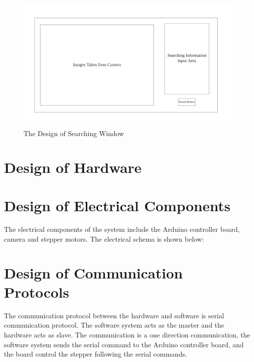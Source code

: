 \documentclass[12pt, titlepage]{article}
\begin{document}
\begin{figure}[H]
    \centering
    \includegraphics[scale=0.8]{Search.png}
    \caption{The Design of Searching Window}
\end{figure}

\section{Design of Hardware}


\section{Design of Electrical Components}

The electrical components of the system include the Arduino controller board, camera and stepper motors. The electrical schema is shown below:
\section{Design of Communication Protocols}


The communication protocol between the hardware and software is serial communication protocol. The software system acts as the master and the hardware acts as slave. The communication is a one direction communication, the software system sends the serial command to the Arduino controller board, and the board control the stepper following the serial commands.
\end{document}
